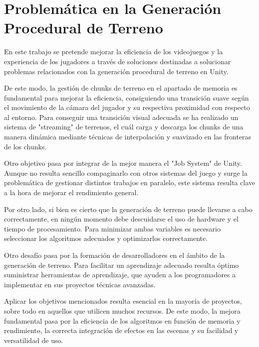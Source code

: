 \section{Problemática en la Generación Procedural de Terreno}

En este trabajo se pretende mejorar la eficiencia de los videojuegos y la experiencia de los jugadores a través de soluciones destinadas a solucionar problemas relacionados con la generación procedural de terreno en Unity.

De este modo, la gestión de chunks de terreno en el apartado de memoria es fundamental para mejorar la eficiencia, consiguiendo una transición suave según el movimiento de la cámara del jugador y su respectiva proximidad con respecto al entorno. Para conseguir una transición visual adecuada se ha realizado un sistema de "streaming" de terrenos, el cuál carga y descarga los chunks de una manera dinámica mediante técnicas de interpolación y suavizado en las fronteras de los chunks.

Otro objetivo pasa por integrar de la mejor manera el "Job System" de Unity. Aunque no resulta sencillo compaginarlo con otros sistemas del juego y surge la problemática de gestionar distintos trabajos en paralelo, este sistema resulta clave a la hora de mejorar el rendimiento general.

Por otro lado, si bien es cierto que la generación de terreno puede llevarse a cabo correctamente, en ningún momento debe descuidarse el uso de hardware y el tiempo de procesamiento. Para minimizar ambas variables es necesario seleccionar los algoritmos adecuados y optimizarlos correctamente.

Otro desafío pasa por la formación de desarrolladores en el ámbito de la generación de terreno. Para facilitar un aprendizaje adecuado resulta óptimo suministrar herramientas de aprendizaje, que ayuden a los programadores a implementar en sus proyectos técnicas avanzadas.

Aplicar los objetivos mencionados resulta esencial en la mayoría de proyectos, sobre todo en aquellos que utilicen muchos recursos. De este modo, la mejora fundamental pasa por la eficiencia de los algoritmos en función de memoria y rendimiento, la correcta integración de efectos en las escenas y su facilidad y versatilidad de uso.

